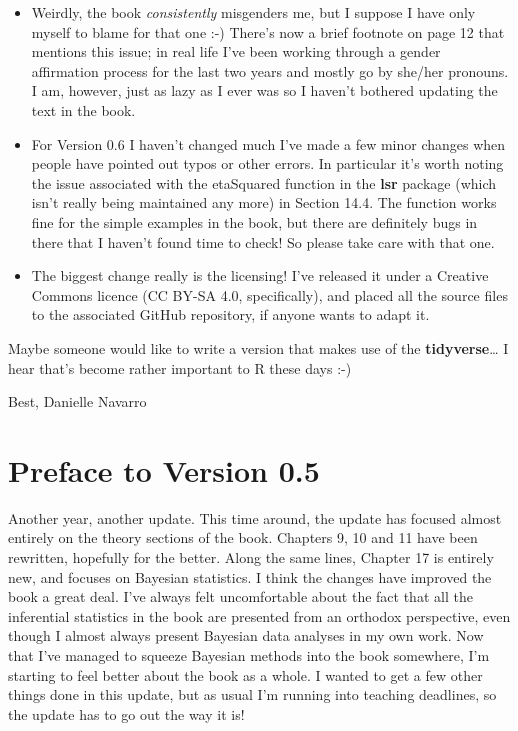 \documentclass[
]{book}
\providecommand{\tightlist}{%
  \setlength{\itemsep}{0pt}\setlength{\parskip}{0pt}}
\begin{document}
\begin{itemize}
\tightlist
\item
  Weirdly, the book \emph{consistently} misgenders me, but I suppose I have only myself to blame for that one :-) There's now a brief footnote on page 12 that mentions this issue; in real life I've been working through a gender affirmation process for the last two years and mostly go by she/her pronouns. I am, however, just as lazy as I ever was so I haven't bothered updating the text in the book.\\
\item
  For Version 0.6 I haven't changed much I've made a few minor changes when people have pointed out typos or other errors. In particular it's worth noting the issue associated with the etaSquared function in the \textbf{lsr} package (which isn't really being maintained any more) in Section 14.4. The function works fine for the simple examples in the book, but there are definitely bugs in there that I haven't found time to check! So please take care with that one.
\item
  The biggest change really is the licensing! I've released it under a Creative Commons licence (CC BY-SA 4.0, specifically), and placed all the source files to the associated GitHub repository, if anyone wants to adapt it.
\end{itemize}

Maybe someone would like to write a version that makes use of the \textbf{tidyverse}\ldots{} I hear that's become rather important to R these days :-)

Best,
Danielle Navarro

\hypertarget{preface-to-version-0.5}{%
\section*{Preface to Version 0.5}\label{preface-to-version-0.5}}

Another year, another update. This time around, the update has focused almost entirely on the theory sections of the book. Chapters 9, 10 and 11 have been rewritten, hopefully for the better. Along the same lines, Chapter 17 is entirely new, and focuses on Bayesian statistics. I think the changes have improved the book a great deal. I've always felt uncomfortable about the fact that all the inferential statistics in the book are presented from an orthodox perspective, even though I almost always present Bayesian data analyses in my own work. Now that I've managed to squeeze Bayesian methods into the book somewhere, I'm starting to feel better about the book as a whole. I wanted to get a few other things done in this update, but as usual I'm running into teaching deadlines, so the update has to go out the way it is!
\end{document}
